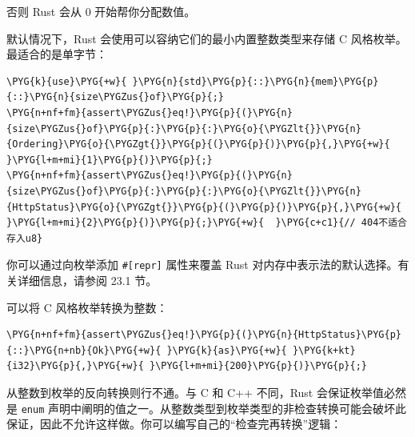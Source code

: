 否则 Rust 会从 0 开始帮你分配数值。

默认情况下，Rust 会使用可以容纳它们的最小内置整数类型来存储 C 风格枚举。最适合的是单字节：

\begin{Verbatim}[commandchars=\\\{\},breaklines=true,breakanywhere=true,fontsize=\codefont,xleftmargin=17bp]
\PYG{k}{use}\PYG{+w}{ }\PYG{n}{std}\PYG{p}{::}\PYG{n}{mem}\PYG{p}{::}\PYG{n}{size\PYGZus{}of}\PYG{p}{;}
\PYG{n+nf+fm}{assert\PYGZus{}eq!}\PYG{p}{(}\PYG{n}{size\PYGZus{}of}\PYG{p}{:}\PYG{p}{:}\PYG{o}{\PYGZlt{}}\PYG{n}{Ordering}\PYG{o}{\PYGZgt{}}\PYG{p}{(}\PYG{p}{)}\PYG{p}{,}\PYG{+w}{ }\PYG{l+m+mi}{1}\PYG{p}{)}\PYG{p}{;}
\PYG{n+nf+fm}{assert\PYGZus{}eq!}\PYG{p}{(}\PYG{n}{size\PYGZus{}of}\PYG{p}{:}\PYG{p}{:}\PYG{o}{\PYGZlt{}}\PYG{n}{HttpStatus}\PYG{o}{\PYGZgt{}}\PYG{p}{(}\PYG{p}{)}\PYG{p}{,}\PYG{+w}{ }\PYG{l+m+mi}{2}\PYG{p}{)}\PYG{p}{;}\PYG{+w}{  }\PYG{c+c1}{// 404不适合存入u8}
\end{Verbatim}

你可以通过向枚举添加 \texttt{\#[repr]} 属性来覆盖 Rust 对内存中表示法的默认选择。有关详细信息，请参阅 23.1 节。

可以将 C 风格枚举转换为整数：

\begin{Verbatim}[commandchars=\\\{\},breaklines=true,breakanywhere=true,fontsize=\codefont,xleftmargin=17bp]
\PYG{n+nf+fm}{assert\PYGZus{}eq!}\PYG{p}{(}\PYG{n}{HttpStatus}\PYG{p}{::}\PYG{n+nb}{Ok}\PYG{+w}{ }\PYG{k}{as}\PYG{+w}{ }\PYG{k+kt}{i32}\PYG{p}{,}\PYG{+w}{ }\PYG{l+m+mi}{200}\PYG{p}{)}\PYG{p}{;}
\end{Verbatim}

从整数到枚举的反向转换则行不通。与 C 和 C++ 不同，Rust 会保证枚举值必然是 \texttt{enum} 声明中阐明的值之一。从整数类型到枚举类型的非检查转换可能会破坏此保证，因此不允许这样做。你可以编写自己的“检查完再转换”逻辑：


